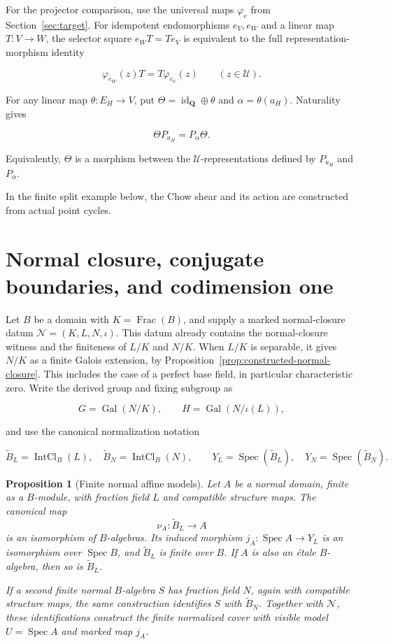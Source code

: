 \documentclass[11pt]{article}
\newtheorem{proposition}[theorem]{Proposition}
\theoremstyle{definition}
\theoremstyle{remark}
\DeclareMathOperator{\Spec}{Spec}
\DeclareMathOperator{\Frac}{Frac}
\DeclareMathOperator{\Gal}{Gal}
\newcommand{\Q}{\mathbf Q}
\begin{document}
For the projector comparison, use the universal maps \(\varphi_e\) from
Section~\ref{sec:target}.
For idempotent endomorphisms
\(e_V,e_W\) and a linear map \(T:V\to W\), the selector square
\(e_WT=Te_V\) is equivalent to the full representation-morphism identity

\[
  \varphi_{e_W}(z)T=T\varphi_{e_V}(z)
  \qquad(z\in\mathcal U).
\]

For any linear map \(\theta:E_H\to V\), put
\(\Theta=\operatorname{id}_{\Q}\oplus\theta\) and
\(\alpha=\theta(a_H)\).  Naturality gives

\[
  \Theta P_{a_H}=P_\alpha\Theta.
\]

Equivalently, \(\Theta\) is a morphism between the
\(\mathcal U\)-representations defined by \(P_{a_H}\) and \(P_\alpha\).

In the finite split example below, the Chow shear and its action are
constructed from actual point cycles.

\section{Normal closure, conjugate boundaries, and codimension one}
\label{sec:boundary}

Let \(B\) be a domain with \(K=\Frac(B)\), and supply a marked
normal-closure datum \(\mathcal N=(K,L,N,\iota)\).  This datum already
contains the normal-closure witness and the finiteness of \(L/K\) and
\(N/K\).  When \(L/K\) is separable, it gives \(N/K\) as a finite
Galois extension, by Proposition~\ref{prop:constructed-normal-closure}.
This includes the case of a perfect base field, in particular
characteristic zero. Write the derived group and
fixing subgroup as

\[
  G=\Gal(N/K),\qquad H=\Gal(N/\iota(L)),
\]

and use the canonical normalization notation

\[
  \widetilde B_L=\operatorname{IntCl}_B(L),\quad
  \widetilde B_N=\operatorname{IntCl}_B(N),\qquad
  Y_L=\Spec(\widetilde B_L),\quad
  Y_N=\Spec(\widetilde B_N).
\]

\begin{proposition}[Finite normal affine models]
\label{prop:finite-normal-affine-model}
Let \(A\) be a normal domain, finite as a \(B\)-module, with
fraction field \(L\) and compatible structure maps. The canonical map
\[
  \nu_A:\widetilde B_L\longrightarrow A
\]
is an isomorphism of \(B\)-algebras. Its induced morphism
\(j_A:\Spec A\to Y_L\) is an isomorphism over \(\Spec B\), and
\(\widetilde B_L\) is finite over \(B\). If \(A\) is also an
\'{e}tale \(B\)-algebra, then so is \(\widetilde B_L\).

If a second finite normal \(B\)-algebra \(S\) has fraction field
\(N\), again with compatible structure maps, the same construction
identifies \(S\) with \(\widetilde B_N\).
Together with \(\mathcal N\), these identifications construct the
finite normalized cover with visible model \(U=\Spec A\) and
marked map \(j_A\).
\end{proposition}
\end{document}
